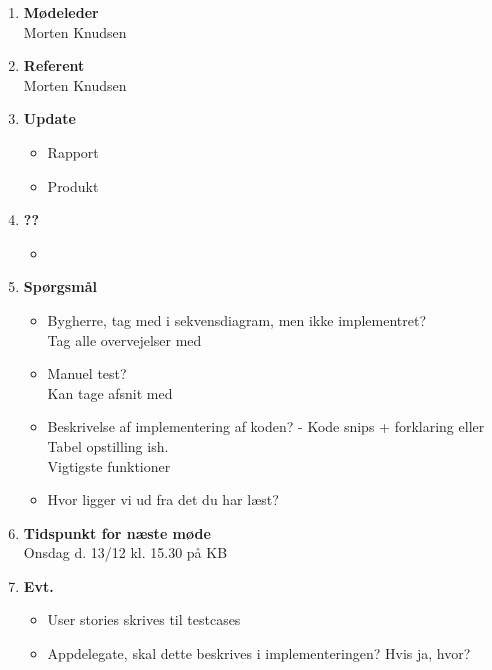 	\begin{enumerate}
		\itemsep 0.3em 
		\item \textbf{Mødeleder}\\
			Morten Knudsen
		\item \textbf{Referent}\\
			Morten Knudsen

		\item \textbf{Update}
			\begin{itemize}[-]
				\item Rapport 
				\item Produkt
								
			\end{itemize}
		
		\item \textbf{??}
		\begin{itemize}[-]
			\item 
		\end{itemize}
			
		\item \textbf{Spørgsmål}
			\begin{itemize}[-]
				\item Bygherre, tag med i sekvensdiagram, men ikke implementret?\\
				Tag alle overvejelser med
				\item Manuel test? \\
				Kan tage afsnit med
				\item Beskrivelse af implementering af koden? - Kode snips + forklaring eller Tabel opstilling ish. \\
				Vigtigste funktioner
				\item Hvor ligger vi ud fra det du har læst?	
			\end{itemize}
	
		\item \textbf{Tidspunkt for næste møde} \\
			Onsdag d. 13/12 kl. 15.30 på KB \\
						
		\item \textbf{Evt.}
			\begin{itemize}[-]
				\item User stories skrives til testcases
				\item Appdelegate, skal dette beskrives i implementeringen? Hvis ja, hvor?
			\end{itemize}
			
	\end{enumerate}
